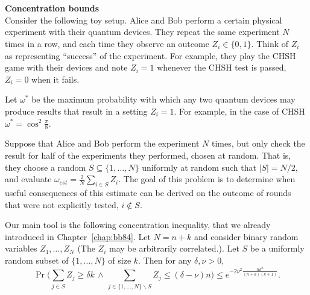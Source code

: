 \chapter{}
\begin{exercises}

\item {\bf Concentration bounds}\\
Consider the following toy setup. Alice and Bob perform a certain physical experiment with their quantum devices. They repeat the same experiment $N$ times in a row, and each time they observe an outcome $Z_i\in\{0,1\}$. Think of $Z_i$ as representing ``success'' of the experiment. For example, they play the CHSH game with their devices and note $Z_i=1$ whenever the CHSH test is passed, $Z_i=0$ when it fails.

Let $\omega^*$ be the maximum probability with which any two quantum devices may produce results that result in a setting $Z_i=1$. For example, in the case of CHSH $\omega^*=\cos^2\frac{\pi}{8}$.

Suppose that Alice and Bob perform the experiment $N$ times, but only check the result for half of the experiments they performed, chosen at random. That is, they choose a random $S\subseteq \{1,\ldots,N\}$ uniformly at random such that $|S|=N/2$, and evaluate $\omega_{est} = \frac{2}{N}\sum_{i\in S} Z_i$. The goal of this problem is to determine when useful consequences of this estimate can be derived on the outcome of rounds that were not explicitly tested, $i\notin S$.

Our main tool is the following concentration inequality, that we already introduced in Chapter~\ref{chap:bb84}.
Let $N=n+k$ and consider binary random variables $Z_1,\ldots,Z_N$ (The $Z_i$ may be arbitrarily correlated.). Let $S$ be a uniformly random subset of $\{1,\ldots,N\}$ of size $k$. Then for any $\delta ,\nu>0$,
$$ \Pr \Big( \sum_{j\in S} Z_j \geq \delta k \,\wedge\, \sum_{j\in\{1,\ldots,N\}\backslash S} Z_j \leq (\delta - \nu)n \Big) \leq e^{-2\nu^2 \frac{nk^2}{(n+k)(k+1)}}.$$


\end{exercises}
